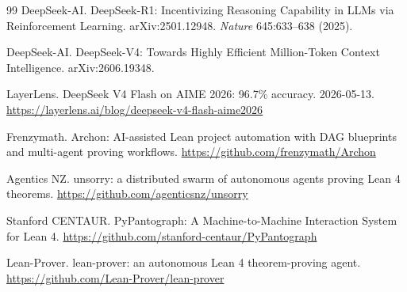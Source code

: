 \documentclass[UTF8,a4paper,11pt,fontset=windows]{ctexart}
\begin{document}
\begin{thebibliography}{99}
 DeepSeek-AI. DeepSeek-R1: Incentivizing Reasoning Capability in LLMs via Reinforcement Learning. arXiv:2501.12948. \emph{Nature} 645:633--638 (2025).

 DeepSeek-AI. DeepSeek-V4: Towards Highly Efficient Million-Token Context Intelligence. arXiv:2606.19348.

 LayerLens. DeepSeek V4 Flash on AIME 2026: 96.7\% accuracy. 2026-05-13. \url{https://layerlens.ai/blog/deepseek-v4-flash-aime2026}

 Frenzymath. Archon: AI-assisted Lean project automation with DAG blueprints and multi-agent proving workflows. \url{https://github.com/frenzymath/Archon}

 Agentics NZ. unsorry: a distributed swarm of autonomous agents proving Lean 4 theorems. \url{https://github.com/agenticsnz/unsorry}

 Stanford CENTAUR. PyPantograph: A Machine-to-Machine Interaction System for Lean 4. \url{https://github.com/stanford-centaur/PyPantograph}

 Lean-Prover. lean-prover: an autonomous Lean 4 theorem-proving agent. \url{https://github.com/Lean-Prover/lean-prover}

\end{thebibliography}
\end{document}
